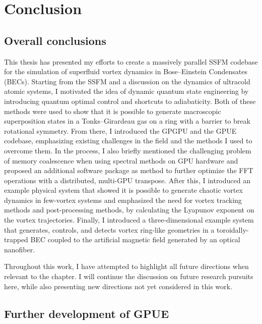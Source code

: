 \chapter*{Conclusion}

\section{Overall conclusions}

\label{ch:conclusion}

This thesis has presented my efforts to create a massively parallel SSFM codebase for the simulation of superfluid vortex dynamics in Bose--Einstein Condensates (BECs).
Starting from the SSFM and a discussion on the dynamics of ultracold atomic systems, I motivated the idea of dynamic quantum state engineering by introducing quantum optimal control and shortcuts to adiabaticity.
Both of these methods were used to show that it is possible to generate macroscopic superposition states in a Tonks--Girardeau gas on a ring with a barrier to break rotational symmetry.
From there, I introduced the GPGPU and the GPUE codebase, emphasizing existing challenges in the field and the methods I used to overcome them.
In the process, I also briefly mentioned the challenging problem of memory coalescence when using spectral methods on GPU hardware and proposed an additional software package as method to further optimize the FFT operations with a distributed, multi-GPU transpose.
After this, I introduced an example physical system that showed it is possible to generate chaotic vortex dynamics in few-vortex systems and emphasized the need for vortex tracking methods and post-processing methods, by calculating the Lyapunov exponent on the vortex trajectories.
Finally, I introduced a three-dimensional example system that generates, controls, and detects vortex ring-like geometries in a toroidally-trapped BEC coupled to the artificial magnetic field generated by an optical nanofiber.

Throughout this work, I have attempted to highlight all future directions when relevant to the chapter.
I will continue the discussion on future research pursuits here, while also presenting new directions not yet considered in this work.

\section{Further development of GPUE}

